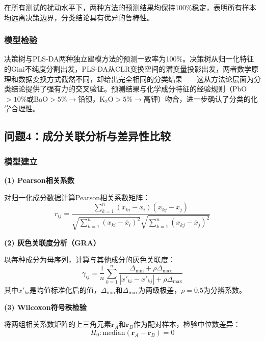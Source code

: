 \documentclass[12pt,a4paper]{ctexart}
\begin{document}
在所有测试的扰动水平下，两种方法的预测结果均保持100\%稳定，表明所有样本均远离决策边界，分类结论具有优异的鲁棒性。

\subsubsection{模型检验}

决策树与PLS-DA两种独立建模方法的预测一致率为100\%。决策树从归一化特征的Gini不纯度分割出发，PLS-DA从CLR变换空间的潜变量投影出发，两者数学原理和数据变换方式截然不同，却给出完全相同的分类结果——这从方法论层面为分类结论提供了强有力的交叉验证。预测结果与化学成分特征的经验规则（PbO$>10\%$或BaO$>5\%\rightarrow$铅钡，K$_2$O$>5\%\rightarrow$高钾\cite{1}）吻合，进一步确认了分类的化学合理性。

\subsection{问题4：成分关联分析与差异性比较}

\subsubsection{模型建立}

\textbf{(1) Pearson相关系数}

对归一化成分数据计算Pearson相关系数矩阵：
\begin{equation}
    r_{ij}=\frac{\sum_{k=1}^{n}(x_{ki}-\bar{x}_i)(x_{kj}-\bar{x}_j)}{\sqrt{\sum_{k=1}^{n}(x_{ki}-\bar{x}_i)^2}\sqrt{\sum_{k=1}^{n}(x_{kj}-\bar{x}_j)^2}}
    \label{eq:pearson}
\end{equation}

\textbf{(2) 灰色关联度分析（GRA）}

以每种成分为母序列，计算与其他成分的灰色关联度：
\begin{equation}
    \gamma_{ij}=\frac{1}{n}\sum_{k=1}^{n}\frac{\Delta_{\min}+\rho\Delta_{\max}}{|x'_{ki}-x'_{kj}|+\rho\Delta_{\max}}
    \label{eq:gra}
\end{equation}
其中$x'_{ki}$是均值标准化后的值，$\Delta_{\min}$和$\Delta_{\max}$为两级极差，$\rho=0.5$为分辨系数\cite{4}。

\textbf{(3) Wilcoxon符号秩检验}

将两组相关系数矩阵的上三角元素$\mathbf{r}_A$和$\mathbf{r}_B$作为配对样本，检验中位数差异：
\begin{equation}
    H_0: \text{median}(\mathbf{r}_A-\mathbf{r}_B)=0
    \label{eq:wilcoxon}
\end{equation}
\end{document}
